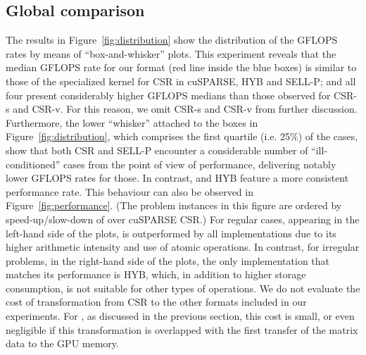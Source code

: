 \subsection{Global comparison}

The results in Figure~\ref{fig:distribution}
show the distribution of the GFLOPS rates
by means of ``box-and-whisker'' plots.
This experiment reveals that
the median GFLOPS rate for our \bcsr format
(red line inside the blue boxes) is similar 
to those of the specialized kernel for CSR in cuSPARSE, HYB and SELL-P;
and all four present considerably higher
GFLOPS medians than those observed for CSR-s and CSR-v.
For this reason, we omit CSR-s and CSR-v from further discussion.
Furthermore, the lower ``whisker'' attached to the boxes in
Figure~\ref{fig:distribution},
which comprises the first quartile (i.e. 25\%) of the cases,
show that both CSR and SELL-P encounter a
considerable number of ``ill-conditioned'' cases
from the point of view of performance,
delivering notably lower GFLOPS rates for those.
In contrast, \bcsr and HYB feature a more consistent performance rate.
This behaviour can also be observed in Figure~\ref{fig:performance}.
(The problem instances in this figure are ordered
by speed-up/slow-down of \bcsr over cuSPARSE CSR.)
For regular cases, appearing in the left-hand side of the plots, \bcsr is outperformed
by all implementations due to its higher arithmetic intensity
and use of atomic operations.
In contrast, for irregular problems, in the right-hand side of the plots,
the only implementation that matches its performance is HYB,
which, in addition to higher storage consumption,
is not suitable for other types of operations.
We do not evaluate the cost of transformation
from CSR to the other formats included in our experiments.
For \bcsr, as discussed in the previous section, this cost is small,
or even negligible if this transformation is overlapped
with the first transfer of the matrix data to the GPU memory.

